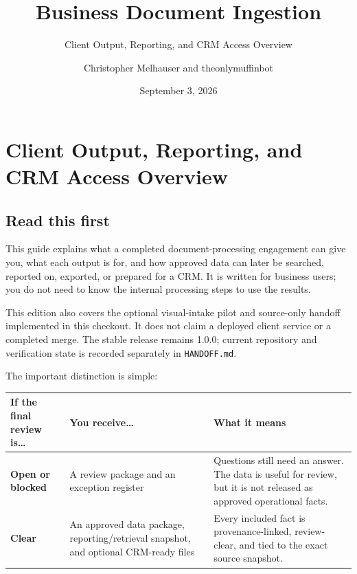 \documentclass[
]{article}
\title{Business Document Ingestion}
\subtitle{Client Output, Reporting, and CRM Access Overview}
\author{Christopher Melhauser and theonlymuffinbot}
\date{September 3, 2026}
\newcounter{none} %
\begin{document}
\maketitle

\section{Client Output, Reporting, and CRM Access
Overview}\label{client-output-reporting-and-crm-access-overview}

\subsection{Read this first}\label{read-this-first}

This guide explains what a completed document-processing engagement can
give you, what each output is for, and how approved data can later be
searched, reported on, exported, or prepared for a CRM. It is written
for business users; you do not need to know the internal processing
steps to use the results.

This edition also covers the optional visual-intake pilot and
source-only handoff implemented in this checkout. It does not claim a
deployed client service or a completed merge. The stable release remains
1.0.0; current repository and verification state is recorded separately
in \texttt{HANDOFF.md}.

The important distinction is simple:

{\def\LTcaptype{none} %
\begin{longtable}[]{@{}
  >{\raggedright\arraybackslash}p{}
  >{\raggedright\arraybackslash}p{}
  >{\raggedright\arraybackslash}p{}@{}}
\toprule\noalign{}
\begin{minipage}[b]{\linewidth}\raggedright
If the final review is\ldots{}
\end{minipage} & \begin{minipage}[b]{\linewidth}\raggedright
You receive\ldots{}
\end{minipage} & \begin{minipage}[b]{\linewidth}\raggedright
What it means
\end{minipage} \\
\midrule\noalign{}
\endhead
\bottomrule\noalign{}
\endlastfoot
\textbf{Open or blocked} & A review package and an exception register &
Questions still need an answer. The data is useful for review, but it is
not released as approved operational facts. \\
\textbf{Clear} & An approved data package, reporting/retrieval snapshot,
and optional CRM-ready files & Every included fact is provenance-linked,
review-clear, and tied to the exact source snapshot. \\
\end{longtable}
}
\end{document}
